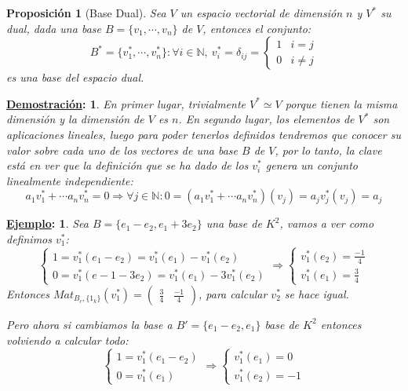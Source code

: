 \documentclass[10pt,a4paper,openright]{book}
\theoremstyle{break}
\newtheorem*{prop}{Proposición}
\newtheorem*{demo}{\underline{Demostración}:}
\newtheorem*{ej}{\underline{Ejemplo}:}
\begin{document}
\begin{prop}[Base Dual]
Sea $V$ un espacio vectorial de dimensión $n$ y $V^*$ su dual, dada una base $B=\{v_1,\cdots, v_n\}$ de $V$, entonces el conjunto:
$$B^*=\{v_1^*, \cdots, v_n^*\} : \forall i \in \mathbb{N}, \ v_i^* = \delta_{ij} =  \begin{cases} 1 & i =j \\ 0 & i \neq j \end{cases}$$
es una base del espacio dual.
\end{prop}
\begin{demo}
En primer lugar, trivialmente $V^*\simeq V$ porque tienen la misma dimensión y la dimensión de $V$ es $n$. En segundo lugar, los elementos de $V^*$ son aplicaciones lineales, luego para poder tenerlos definidos tendremos que conocer su valor sobre cada uno de los vectores de una base $B$ de $V$, por lo tanto, la clave está en ver que la definición que se ha dado de los $v_i^*$ genera un conjunto linealmente independiente:
$$a_1v_1^* +\cdots a_nv_n^*=0\Rightarrow \forall j\in \mathbb N : 0=(a_1v_1^*+\cdots a_nv_n^*)(v_j)= a_jv_j^*(v_j)=a_j$$
\end{demo}

\begin{ej}
Sea $B=\{e_1-e_2, e_1+3e_2\}$ una base de $K^2$, vamos a ver como definimos $v_1^*$:
$$\begin{cases}1=v_1^*(e_1-e_2)=v_1^*(e_1)-v_1^*(e_2)\\ 0=v_1^*(e-1-3e_2)= v_1^*(e_1)-3v_1^*(e_2)\end{cases}\Rightarrow \begin{cases}v_1^*(e_2)=\frac{-1}{4} \\ v_1^*(e_1)=\frac{3}{4}\end{cases}$$
Entonces $Mat_{B_c, \{1_k\}}(v_1^*)=\begin{pmatrix} \frac{3}{4} & \frac{-1}{4}\end{pmatrix}$, para calcular $v_2^*$ se hace igual.

Pero ahora si cambiamos la base a $B'=\{e_1-e_2, e_1\}$ base de $K^2$ entonces volviendo a calcular todo:
$$\begin{cases}1= v_1^*(e_1-e_2) \\0=v_1^*(e_1) \end{cases}\Rightarrow \begin{cases}v_1^*(e_1)=0 \\ v_1^*(e_2)=-1\end{cases}$$
\end{ej}
\end{document}
